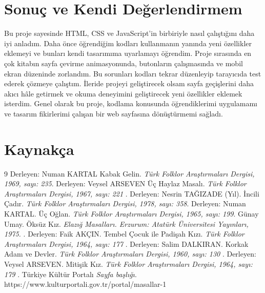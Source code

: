 \documentclass[12pt,a4paper]{article}
\begin{document}
\section{Sonuç ve Kendi Değerlendirmem}

Bu proje sayesinde HTML, CSS ve JavaScript'in birbiriyle nasıl çalıştığını daha iyi anladım. Daha önce öğrendiğim kodları kullanmanın yanında yeni özellikler eklemeyi ve bunları kendi tasarımıma uyarlamayı öğrendim. Proje sırasında en çok kitabın sayfa çevirme animasyonunda, butonların çalışmasında ve mobil ekran düzeninde zorlandım. Bu sorunları kodları tekrar düzenleyip tarayıcıda test ederek çözmeye çalıştım. İleride projeyi geliştirecek olsam sayfa geçişlerini daha akıcı hâle getirmek ve okuma deneyimini geliştirecek yeni özellikler eklemek isterdim. Genel olarak bu proje, kodlama konusunda öğrendiklerimi uygulamamı ve tasarım fikirlerimi çalışan bir web sayfasına dönüştürmemi sağladı.

\section{Kaynakça}


\begin{thebibliography}{9}
 Derleyen: Numan KARTAL Kabak Gelin. \emph{Türk Folklor Araştırmaları Dergisi, 1969, sayı: 235}.
 Derleyen: Veysel ARSEVEN  Üç Haylaz Masalı. \emph{Türk Folklor Araştırmaları Dergisi, 1967, sayı: 221 }. 
 Derleyen: Nesrin TAĞIZADE (Yıl). İncili Çadır. \emph{Türk Folklor Araştırmaları Dergisi, 1978, sayı: 358}.
 Derleyen: Numan KARTAL. Üç Oğlan. \emph{Türk Folklor Araştırmaları Dergisi, 1965, sayı: 199}.
 Günay Umay. Öksüz Kız. \emph{Elazığ Masalları. Erzurum: Atatürk Üniversitesi   Yayınları, 1975. }.
 Derleyen: Faik AKÇIN. Tembel Çocuk ile Padişah Kızı. \emph{ Türk Folklor Araştırmaları Dergisi, 1964, sayı: 177 }. 
 Derleyen: Salim DALKIRAN. Korkak Adam ve Devler. \emph{Türk Folklor Araştırmaları Dergisi, 1960, sayı: 130 }. 
 Derleyen: Veysel ARSEVEN. Mitişik Kız. \emph{Türk Folklor Araştırmaları Dergisi, 1964, sayı: 179 }.
 Türkiye Kültür Portalı \emph{Sayfa başlığı}. https://www.kulturportali.gov.tr/portal/masallar-1

\end{thebibliography}
\end{document}
